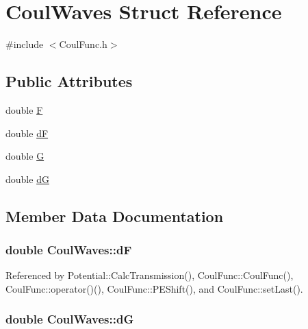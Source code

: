 \hypertarget{structCoulWaves}{\section{Coul\-Waves Struct Reference}
\label{structCoulWaves}
}


{\ttfamily \#include $<$Coul\-Func.\-h$>$}

\subsection*{Public Attributes}
\begin{DoxyCompactItemize}
\item 
double \hyperlink{structCoulWaves_ad04a2d9552d7cfc775f35cd179000553}{F}
\item 
double \hyperlink{structCoulWaves_ac85f757250d93923d47519f4b8f13117}{d\-F}
\item 
double \hyperlink{structCoulWaves_a6ed564ba02c1d0b75b2453f8129eae48}{G}
\item 
double \hyperlink{structCoulWaves_a8eea43731321d6e28f5ecba6d73f0174}{d\-G}
\end{DoxyCompactItemize}


\subsection{Member Data Documentation}
\hypertarget{structCoulWaves_ac85f757250d93923d47519f4b8f13117}{
\subsubsection[{d\-F}]{\setlength{\rightskip}{0pt plus 5cm}double Coul\-Waves\-::d\-F}}\label{structCoulWaves_ac85f757250d93923d47519f4b8f13117}


Referenced by Potential\-::\-Calc\-Transmission(), Coul\-Func\-::\-Coul\-Func(), Coul\-Func\-::operator()(), Coul\-Func\-::\-P\-E\-Shift(), and Coul\-Func\-::set\-Last().

\hypertarget{structCoulWaves_a8eea43731321d6e28f5ecba6d73f0174}{
\subsubsection[{d\-G}]{\setlength{\rightskip}{0pt plus 5cm}double Coul\-Waves\-::d\-G}}\label{structCoulWaves_a8eea43731321d6e28f5ecba6d73f0174}


